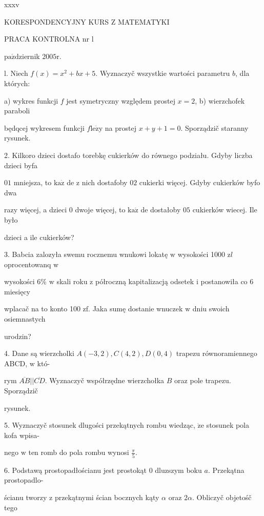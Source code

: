 \documentclass[a4paper,12pt]{article}
\begin{document}
xxxv

KORESPONDENCYJNY KURS Z MATEMATYKI

PRACA KONTROLNA nr l

$\mathrm{p}\mathrm{a}\acute{\mathrm{z}}$dziernik 2$005\mathrm{r}.$

l. Niech $f(x) = x^{2}+bx+5$. Wyznaczyč wszystkie wartości parametru $b$, dla których:

a) wykres funkcji $f$ jest symetryczny względem prostej $x=2$, b) wierzchofek paraboli

będqcej wykresem funkcji $f\mathrm{l}\mathrm{e}\dot{\mathrm{z}}\mathrm{y}$ na prostej $x+y+1=0$. Sporządzič staranny rysunek.

2. Kilkoro dzieci dostafo torebkę cukierków do równego podziału. Gdyby liczba dzieci byfa

$01$ mniejsza, to $\mathrm{k}\mathrm{a}\dot{\mathrm{z}}$ de $\mathrm{z}$ nich dostafoby $02$ cukierki więcej. Gdyby cukierków byfo dwa

razy więcej, a dzieci $0$ dwoje więcej, to $\mathrm{k}\mathrm{a}\dot{\mathrm{z}}$ de dostałoby $05$ cukierków wiecej. Ile było

dzieci a ile cukierków?

3. Babcia zalozyła swemu rocznemu wnukowi lokatę $\mathrm{w}$ wysokości 1000 $\mathrm{z}l$ oprocentowanq $\mathrm{w}$

wysokości 6\% $\mathrm{w}$ skali roku $\mathrm{z}$ półroczną kapitalizacją odsetek $\mathrm{i}$ postanowiła co 6 miesięcy

wplacač na to konto 100 $\mathrm{z}\mathrm{f}$. Jaka sumę dostanie wnuczek $\mathrm{w}$ dniu swoich osiemnastych

urodzin?

4. Dane są wierzcholki $A(-3,2), C(4,2), D(0,4)$ trapezu równoramiennego ABCD, $\mathrm{w}$ któ-

rym $\overline{AB}||\overline{CD}$. Wyznaczyč współrzędne wierzchołka $B$ oraz pole trapezu. Sporządzič

rysunek.

5. Wyznaczyč stosunek dlugości przekątnych rombu wiedząc, $\dot{\mathrm{z}}\mathrm{e}$ stosunek pola kofa wpisa-

nego $\mathrm{w}$ ten romb do pola rombu wynosi $\displaystyle \frac{\pi}{5}.$

6. Podstawą prostopadłościanu jest prostokąt $0$ dluzszym boku $a$. Przekątna prostopadlo-

ścianu tworzy $\mathrm{z}$ przekątnymi ścian bocznych kąty $\alpha$ oraz $ 2\alpha$. Obliczyč objetośč tego
\end{document}
